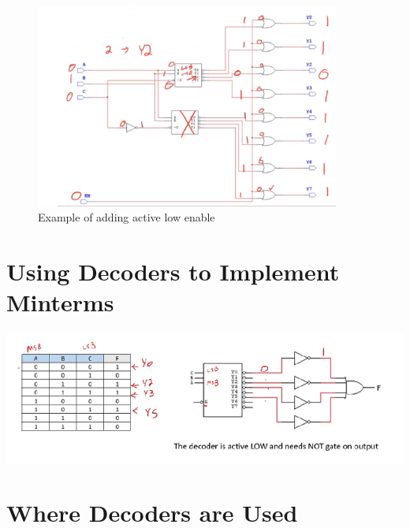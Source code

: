 \documentclass[a4paper,12pt]{article}
\begin{document}
                  \begin{figure}
                    \includegraphics[width=10cm]{AddingEnables.png}
                    \caption{Example of adding active low enable}
                  \end{figure}
                
                \section{Using Decoders to Implement Minterms}  
                  \includegraphics[width=15cm]{mintermDecoder.png}

                \section{Where Decoders are Used}
\end{document}
